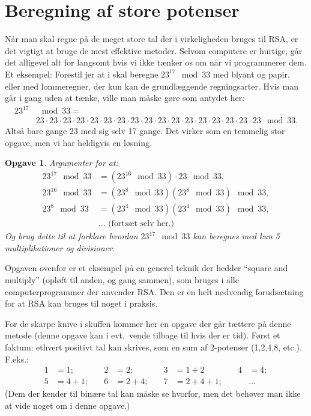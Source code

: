 \documentclass{article}
\theoremstyle{opgavedd}
\newtheorem{opgave}{Opgave}[section]
\begin{document}
\section{Beregning af store potenser}
Når man skal regne på de meget store tal der i virkeligheden bruges til RSA, er det
vigtigt at bruge de mest effektive metoder. Selvom computere er hurtige, går det alligevel
alt for langsomt hvis vi ikke tænker os om når vi programmerer dem. Et eksempel: Forestil
jer at i skal beregne $23^{17}\mod 33$ med blyant og papir, eller med lommeregner, der kun
kan de grundlæggende regningsarter. Hvis man går i gang uden at tænke, ville man måske
gøre som antydet her:
\begin{align*}
  23^{17} &\mod 33 = \\
          & 23\cdot 23\cdot 23\cdot 23\cdot 23\cdot 23\cdot 23\cdot 23\cdot
            23\cdot 23\cdot 23\cdot 23\cdot 23\cdot 23\cdot 23\cdot 23\cdot
            23 \mod 33.
\end{align*}
Altså bare gange 23 med sig selv 17 gange. Det virker som en temmelig stor opgave, men vi
har heldigvis en løsning.

\begin{opgave}\label{opg-sqr-n-mul}
  Argumenter for at:
  \begin{align*}
    23^{17}\mod 33 &= (23^{16}\mod 33)\cdot 23 \mod 33, \\
    23^{16}\mod 33 &= (23^{8}\mod 33)(23^{8}\mod 33)\mod 33, \\
    23^{8}\mod 33  &= (23^{4}\mod 33)(23^{4}\mod 33)\mod 33, \\
    & \dots\text{ (fortsæt selv her.)}
  \end{align*}
  Og brug dette til at forklare hvordan $23^{17}\mod 33$ kan beregnes med kun 5
  multiplikationer og divisioner.
\end{opgave}

Opgaven ovenfor er et eksempel på en generel teknik der hedder ``square and multiply''
(opløft til anden, og gang sammen), som bruges i alle computerprogrammer der anvender
RSA. Den er en helt nødvendig forudsætning for at RSA kan bruges til noget i praksis.

For de skarpe knive i skuffen kommer her en opgave der går tættere på denne metode (denne
opgave kan i evt.~vende tilbage til hvis der er tid). Først et faktum: ethvert positivt tal
kan skrives, som en sum af 2-potenser (1,2,4,8, etc.). F.eks.:
\begin{align*}
  1 &= 1; &\quad  2 &= 2; &\quad 3 &= 1 + 2 &\quad 4 &= 4; \\
  5 &= 4 +1; &\quad 6&=2+4; &\quad 7&=2+4+1; &\quad &\dots
\end{align*}
(Dem der kender til binære tal kan måske se hvorfor, men det behøver man ikke at vide
noget om i denne opgave.)
\end{document}
